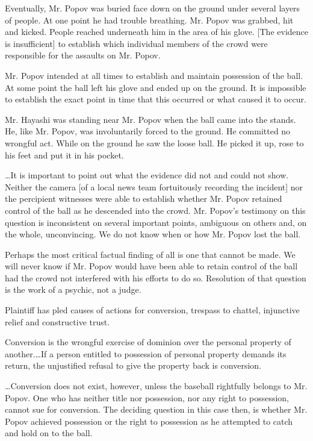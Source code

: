 Eventually, Mr. Popov was buried face down on the ground under several layers of
people. At one point he had trouble breathing. Mr. Popov was grabbed, hit and
kicked. People reached underneath him in the area of his glove. [The evidence is
insufficient] to establish which individual members of the crowd were
responsible for the assaults on Mr. Popov.

Mr. Popov intended at all times to establish and maintain possession of the
ball. At some point the ball left his glove and ended up on the ground. It is
impossible to establish the exact point in time that this occurred or what
caused it to occur.

Mr. Hayashi was standing near Mr. Popov when the ball came into the stands. He,
like Mr. Popov, was involuntarily forced to the ground. He committed no wrongful
act. While on the ground he saw the loose ball. He picked it up, rose to his
feet and put it in his pocket.

\ldots It is important to point out what the evidence did not and could not
show. Neither the camera [of a local news team fortuitously recording the
incident] nor the percipient witnesses were able to establish whether Mr. Popov
retained control of the ball as he descended into the crowd. Mr. Popov's
testimony on this question is inconsistent on several important points,
ambiguous on others and, on the whole, unconvincing. We do not know when or how
Mr. Popov lost the ball.

Perhaps the most critical factual finding of all is one that cannot be made. We
will never know if Mr. Popov would have been able to retain control of the ball
had the crowd not interfered with his efforts to do so. Resolution of that
question is the work of a psychic, not a judge.


Plaintiff has pled causes of actions for conversion, trespass to chattel,
injunctive relief and constructive trust.

Conversion is the wrongful exercise of dominion over the personal property of
another.\ldots If a person entitled to possession of personal property demands
its return, the unjustified refusal to give the property back is conversion. 

\ldots Conversion does not exist, however, unless the baseball rightfully
belongs to Mr. Popov. One who has neither title nor possession, nor any right to
possession, cannot sue for conversion. The deciding question in this case then,
is whether Mr. Popov achieved possession or the right to possession as he
attempted to catch and hold on to the ball.

